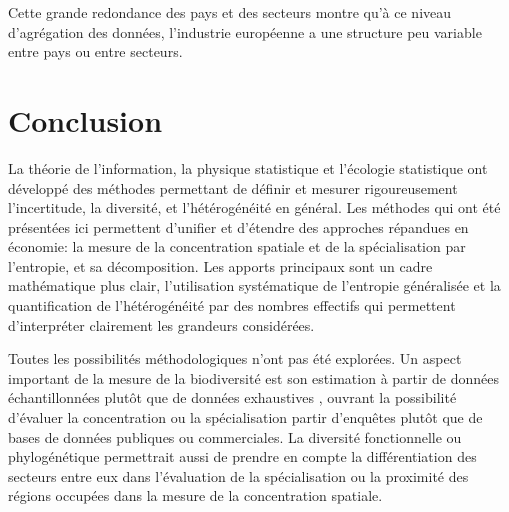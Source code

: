 \documentclass[fleqn,10pt]{ArtEcoFoG} %
\begin{document}
Cette grande redondance des pays et des secteurs montre qu'à ce niveau
d'agrégation des données, l'industrie européenne a une structure peu
variable entre pays ou entre secteurs.

\section{Conclusion}\label{conclusion}

La théorie de l'information, la physique statistique et l'écologie
statistique ont développé des méthodes permettant de définir et mesurer
rigoureusement l'incertitude, la diversité, et l'hétérogénéité en
général. Les méthodes qui ont été présentées ici permettent d'unifier et
d'étendre des approches répandues en économie: la mesure de la
concentration spatiale et de la spécialisation par l'entropie, et sa
décomposition. Les apports principaux sont un cadre mathématique plus
clair, l'utilisation systématique de l'entropie généralisée et la
quantification de l'hétérogénéité par des nombres effectifs qui
permettent d'interpréter clairement les grandeurs considérées.

Toutes les possibilités méthodologiques n'ont pas été explorées. Un
aspect important de la mesure de la biodiversité est son estimation à
partir de données échantillonnées plutôt que de données exhaustives
\citep{Marcon2015a}, ouvrant la possibilité d'évaluer la concentration
ou la spécialisation partir d'enquêtes plutôt que de bases de données
publiques ou commerciales. La diversité fonctionnelle ou phylogénétique
\citep{Marcon2014b} permettrait aussi de prendre en compte la
différentiation des secteurs entre eux dans l'évaluation de la
spécialisation ou la proximité des régions occupées dans la mesure de la
concentration spatiale.





\end{document}
